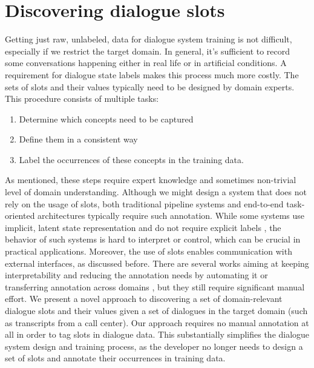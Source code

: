 \section{Discovering dialogue slots}
Getting just raw, unlabeled, data for dialogue system training is not difficult, especially if we restrict the target domain.
In general, it's sufficient to record some conversations happening either in real life or in artificial conditions. 
A requirement for dialogue state labels makes this process much more costly.
The sets of slots and their values typically need to be designed by domain experts.
This procedure consists of multiple tasks:
\begin{enumerate}
    \item Determine which concepts need to be captured
    \item Define them in a consistent way
    \item Label the occurrences of these concepts in the training data.
\end{enumerate}
As mentioned, these steps require expert knowledge and sometimes non-trivial level of domain understanding.
Although we might design a system that does not rely on the usage of slots, both traditional pipeline systems \cite{young_pomdp-based_2013} and end-to-end task-oriented architectures \cite{wen2016network} typically require such annotation.
While some systems use implicit, latent state representation and do not require explicit labels \citep{serban2016building}, the behavior of such systems is hard to interpret or control, which can be crucial in practical applications.
Moreover, the use of slots enables communication with external interfaces, as discussed before.
There are several works aiming at keeping interpretability and reducing the annotation needs by automating it \citep{chen2014leveraging,chen2015jointly} or transferring annotation across domains \cite{zhao_zero-shot_2018,coope_span-convert_2020}, but they still require significant manual effort.
We present a novel approach to discovering a set of domain-relevant dialogue slots and their values given a set of dialogues in the target domain (such as transcripts from a call center).
Our approach requires no manual annotation at all in order to tag slots in dialogue data.
This substantially simplifies the dialogue system design and training process, as the developer no longer needs to design a set of slots and annotate their occurrences in training data.
